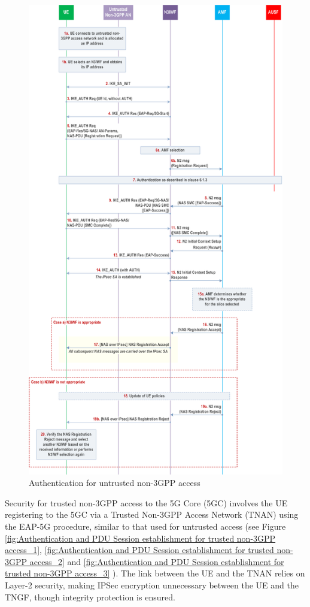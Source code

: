 \begin{figure}
    \centering
    \includegraphics[width=0.75\linewidth]{figs/Authentication for untrusted non-3GPP access.png}
    \caption{Authentication for untrusted non-3GPP access}
    \label{fig:Authentication for untrusted non-3GPP access}
\end{figure}

Security for trusted non-3GPP access to the 5G Core (5GC) involves the UE registering to the 5GC via a Trusted Non-3GPP Access Network (TNAN) using the EAP-5G procedure, similar to that used for untrusted access (see Figure \ref{fig:Authentication and PDU Session establishment for trusted non-3GPP access_1}, \ref{fig:Authentication and PDU Session establishment for trusted non-3GPP access_2} and \ref{fig:Authentication and PDU Session establishment for trusted non-3GPP access_3} ). The link between the UE and the TNAN relies on Layer-2 security, making IPSec encryption unnecessary between the UE and the TNGF, though integrity protection is ensured.

